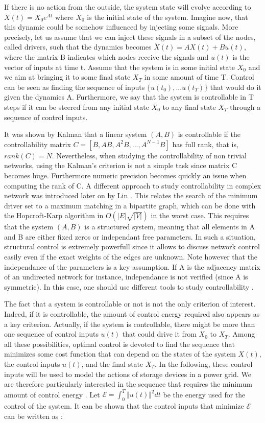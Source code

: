 \documentclass[conference]{IEEEtran}
\begin{document}
If there is no action from the outside, the system state will evolve according to $ X(t) = X_0 e^{At} $ where $X_0$ is the initial state of the system. Imagine now, that this dynamic could be somehow influenced by injecting some signals. More precisely, let us assume that we can inject these signals in a subset of the nodes, called drivers, such that the dynamics becomes $ \dot{ X }(t) = A X(t) + B u(t) $, where the matrix B indicates which nodes receive the signals and $ u(t) $ is the vector of inputs at time t. Assume that the system is in some initial state $X_0$ and we aim at bringing it to some final state $X_T$ in some amount of time T. Control can be seen as finding the sequence of inputs $\{u(t_0),...u(t_T)\} $ that would do it given the dynamics A. Furthermore, we say that the system is controllable in T steps if it can be steered from any initial state $ X_0 $ to any final state $ X_T $ through a sequence of control inputs. 

It was shown by Kalman that a linear system $(A,B)$ is controllable if the controllability matrix $ C = [B,AB,A^2B,...,A^{N-1}B] $ has full rank, that is, $rank(C) = N$. Nevertheless, when studying the controllability of non trivial networks, using the Kalman's criterion is not a simple task since matrix C becomes huge. Furthermore numeric precision becomes quickly an issue when computing the rank of C. A different approach to study controllability in complex network was introduced later on by Lin \cite{1100557}. This relates the search of the minimum driver set to a maximum matching in a bipartite graph, which can be done with the Hopcroft-Karp algorithm in $ O(|E|\sqrt{|V|}) $ in the worst case. This requires that the system $(A,B)$ is a structured system, meaning that all elements in A and B are either fixed zeros or independant free parameters. In such a situation, structural control is extremely powerfull since it allows to discuss network control easily even if the exact weights of the edges are unknown. Note however that the independance of the parameters is a key assumption. If A is the adjacency matrix of an undirected network for instance, independance is not verified (since A is symmetric). In this case, one should use different tools to study controllability \cite{Yuan2014}. 

The fact that a system is controllable or not is not the only criterion of interest. Indeed, if it is controllable, the amount of control energy required also appears as a key criterion. Actually, if the system is controllable, there might be more than one sequence of control inputs $u(t)$ that could drive it from $X_0$ to $X_T$. Among all these possibilities, optimal control is devoted to find the sequence that minimizes some cost function that can depend on the states of the system $X(t)$, the control inputs $u(t)$, and the final state $X_T$. In the following, these control inputs will be used to model the actions of storage devices in a power grid. We are therefore particularly interested in the sequence that requires the minimum amount of control energy \cite{Yan2012}. Let $ \mathcal{E} = \int_{0}^{T} \Vert u(t) \Vert^2 dt $ be the energy used for the control of the system. It can be shown \cite{Liu2015} that the control inputs that minimize $ \mathcal{E} $ can be written as :
\end{document}
